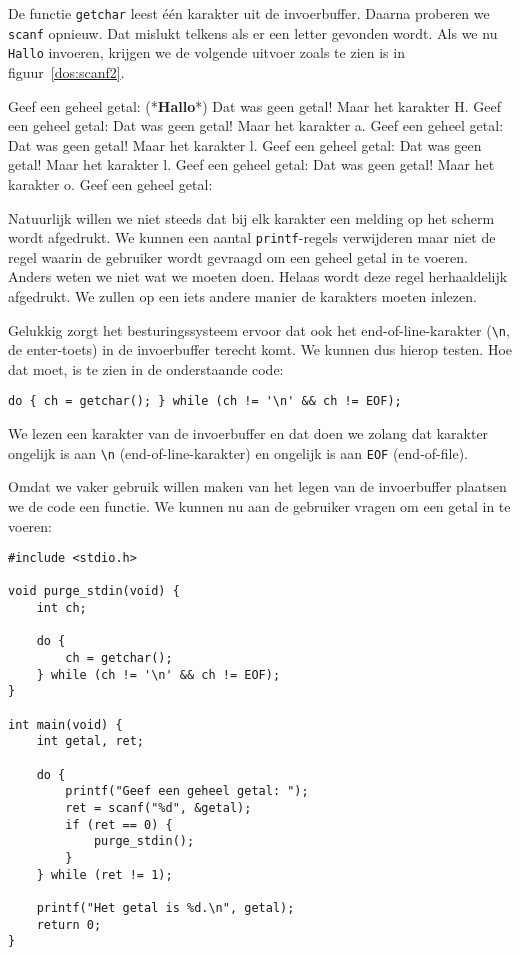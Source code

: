 De functie \texttt{getchar} leest \'e\'en karakter uit de invoerbuffer. Daarna proberen we \texttt{scanf} opnieuw. Dat mislukt telkens als er een letter gevonden wordt. Als we nu \texttt{Hallo} invoeren, krijgen we de volgende uitvoer zoals te zien is in figuur~\ref{dos:scanf2}.

\begin{dosbox}[title=Uitvoer van het programma.,label=dos:scanf2]
Geef een geheel getal: (*\textbf{Hallo}*)
Dat was geen getal!
Maar het karakter H.
Geef een geheel getal: Dat was geen getal!
Maar het karakter a.
Geef een geheel getal: Dat was geen getal!
Maar het karakter l.
Geef een geheel getal: Dat was geen getal!
Maar het karakter l.
Geef een geheel getal: Dat was geen getal!
Maar het karakter o.
Geef een geheel getal:
\end{dosbox}

Natuurlijk willen we niet steeds dat bij elk karakter een melding op het scherm wordt afgedrukt. We kunnen een aantal \texttt{printf}-regels verwijderen maar niet de regel waarin de gebruiker wordt gevraagd om een geheel getal in te voeren. Anders weten we niet wat we moeten doen. Helaas wordt deze regel herhaaldelijk afgedrukt. We zullen op een iets andere manier de karakters moeten inlezen.

Gelukkig zorgt het besturingssysteem ervoor dat ook het end-of-line-karakter (\texttt{\textbackslash n}, de enter-toets) in de invoerbuffer terecht komt. We kunnen dus hierop testen. Hoe dat moet, is te zien in de onderstaande code:

\begin{lstlisting}[style=lstoneline]
do { ch = getchar(); } while (ch != '\n' && ch != EOF);
\end{lstlisting}

We lezen een karakter van de invoerbuffer en dat doen we zolang dat karakter ongelijk is aan \texttt{\textbackslash n} (end-of-line-karakter) en ongelijk is aan \texttt{EOF} (end-of-file).

Omdat we vaker gebruik willen maken van het legen van de invoerbuffer plaatsen we de code een functie. We kunnen nu aan de gebruiker vragen om een getal in te voeren:

\begin{lstlisting}[]
#include <stdio.h>

void purge_stdin(void) {
    int ch;

    do {
        ch = getchar();
    } while (ch != '\n' && ch != EOF);
}

int main(void) {
    int getal, ret;

    do {
        printf("Geef een geheel getal: ");
        ret = scanf("%d", &getal);
        if (ret == 0) {
            purge_stdin();
        }
    } while (ret != 1);

    printf("Het getal is %d.\n", getal);
    return 0;
}
\end{lstlisting}

